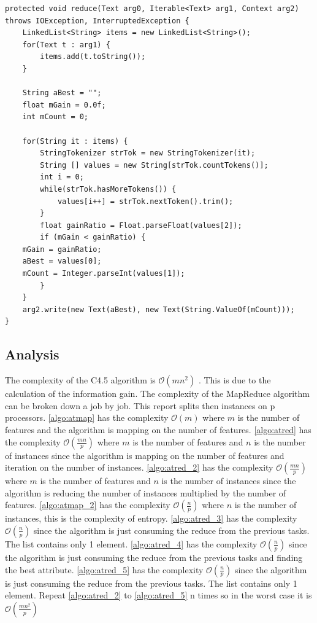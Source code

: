 \documentclass{article}
\begin{document}
\begin{lstlisting}[caption={Attrib Selection Reducer 2 code snippet},label={lst:attrselred},style=MyJavaStyle]
protected void reduce(Text arg0, Iterable<Text> arg1, Context arg2)
throws IOException, InterruptedException {
    LinkedList<String> items = new LinkedList<String>();
    for(Text t : arg1) {
        items.add(t.toString());
    }

    String aBest = "";
    float mGain = 0.0f;
    int mCount = 0;

    for(String it : items) {
        StringTokenizer strTok = new StringTokenizer(it);
        String [] values = new String[strTok.countTokens()];
        int i = 0;
        while(strTok.hasMoreTokens()) {
            values[i++] = strTok.nextToken().trim();
        }
        float gainRatio = Float.parseFloat(values[2]);
        if (mGain < gainRatio) {
	mGain = gainRatio;
	aBest = values[0];
	mCount = Integer.parseInt(values[1]);
        }
    }
    arg2.write(new Text(aBest), new Text(String.ValueOf(mCount)));
}
\end{lstlisting}

\subsection{Analysis}
The complexity of the C4.5 algorithm is $\mathcal{O}(mn^{2})$ \cite{complexity}. This is due to the calculation of the information gain.
The complexity of the MapReduce algorithm can be broken down a job by job. This report splits then instances on p processors.
\ref{algo:atmap} has the complexity $\mathcal{O}(m)$ where $m$ is the number of features and the algorithm is mapping on the number of features.
\ref{algo:atred} has the complexity $\mathcal{O}(\frac{mn}{p})$ where $m$ is the number of features and $n$ is the number of instances since the algorithm is mapping on the number of features and iteration on the number of instances.
\ref{algo:atred_2} has the complexity $\mathcal{O}(\frac{mn}{p})$ where $m$ is the number of features and $n$ is the number of instances since the algorithm is reducing the number of instances multiplied by the number of features.
\ref{algo:atmap_2} has the complexity $\mathcal{O}(\frac{n}{p})$ where $n$ is the number of instances, this is the complexity of entropy. \cite{complexity}
\ref{algo:atred_3} has the complexity $\mathcal{O}(\frac{n}{p})$ since the algorithm is just consuming the reduce from the previous tasks. The list contains only 1 element.
\ref{algo:atred_4} has the complexity $\mathcal{O}(\frac{n}{p})$ since the algorithm is just consuming the reduce from the previous tasks and finding the best attribute.
\ref{algo:atred_5} has the complexity $\mathcal{O}(\frac{n}{p})$ since the algorithm is just consuming the reduce from the previous tasks. The list contains only 1 element.
Repeat \ref{algo:atred_2} to \ref{algo:atred_5} n times so in the worst case it is $\mathcal{O}(\frac{mn^{2}}{p})$
\end{document}
